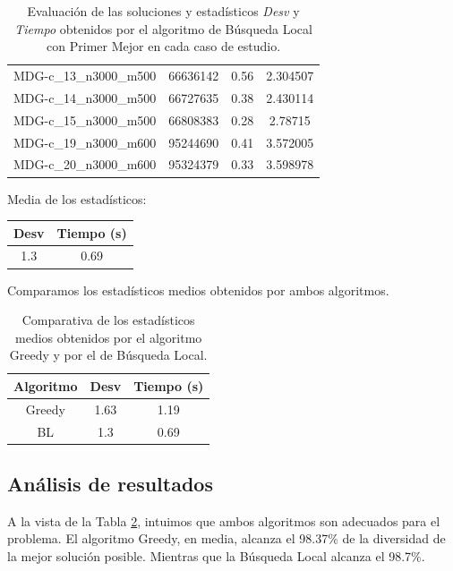 \documentclass{article}
\begin{document}
\begin{table}[H]
\begin{tabular}{|cccc|}
		MDG-c\_13\_n3000\_m500 & 66636142 & 0.56 & 2.304507\\
		MDG-c\_14\_n3000\_m500 & 66727635 & 0.38 & 2.430114\\
		MDG-c\_15\_n3000\_m500 & 66808383 & 0.28 & 2.78715\\
		MDG-c\_19\_n3000\_m600 & 95244690 & 0.41 & 3.572005\\
		MDG-c\_20\_n3000\_m600 & 95324379 & 0.33 & 3.598978\\
		\hline
	\end{tabular}
	\caption{Evaluación de las soluciones y estadísticos \emph{Desv} y \emph{Tiempo} obtenidos por el algoritmo de Búsqueda Local
		con Primer Mejor en cada caso de estudio.}
	\label{tab:bs-primer-mejor}
\end{table}

Media de los estadísticos:
\begin{table}[H]
	\centering
	\begin{tabular}{|cc|}
		\hline
		Desv & Tiempo (s)\\ \hline
		1.3 & 0.69 \\
		\hline
	\end{tabular}
\end{table}

Comparamos los estadísticos medios obtenidos por ambos algoritmos.

\begin{table}[H]
	\centering
	\begin{tabular}{|ccc|}
		\hline
		Algoritmo & Desv & Tiempo (s)\\ \hline
		Greedy & 1.63 & 1.19 \\
		BL & 1.3 & 0.69 \\
		\hline
	\end{tabular}
	\caption{Comparativa de los estadísticos medios obtenidos por el algoritmo Greedy y por el de Búsqueda Local.}
	\label{tab:comparativa}
\end{table}

\pagebreak

\subsection{Análisis de resultados}

A la vista de la Tabla \ref{tab:comparativa}, intuimos que ambos algoritmos son adecuados para el problema.
El algoritmo Greedy, en media, alcanza el 98.37\% de la diversidad de la mejor solución posible. Mientras que la Búsqueda Local
 alcanza el 98.7\%.
 
\end{document}
